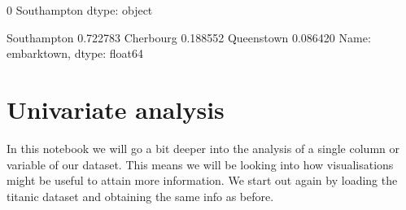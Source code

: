 \documentclass[letterpaper,10pt,english]{jupyterBook}
\begin{document}
\begin{sphinxVerbatim}[commandchars=\\\{\}]
\PYG{p}{[}\PYG{p}{]}
\end{sphinxVerbatim}

\begin{sphinxVerbatim}[commandchars=\\\{\}]
0    Southampton
dtype: object
\end{sphinxVerbatim}

\begin{sphinxVerbatim}[commandchars=\\\{\}]
\PYG{p}{[}\PYG{p}{]}
\end{sphinxVerbatim}

\begin{sphinxVerbatim}[commandchars=\\\{\}]
Southampton    0.722783
Cherbourg      0.188552
Queenstown     0.086420
Name: embark\PYGZus{}town, dtype: float64
\end{sphinxVerbatim}


\chapter{Uni\sphinxhyphen{}variate analysis}
\label{\detokenize{c5_data_exploration/univariate_analysis:uni-variate-analysis}}\label{\detokenize{c5_data_exploration/univariate_analysis::doc}}
\sphinxAtStartPar
In this notebook we will go a bit deeper into the analysis of a single column or variable of our dataset. This means we will be looking into how visualisations might be useful to attain more information. We start out again by loading the titanic dataset and obtaining the same info as before.

\begin{sphinxVerbatim}[commandchars=\\\{\}]
   
  
\end{sphinxVerbatim}
\end{document}
